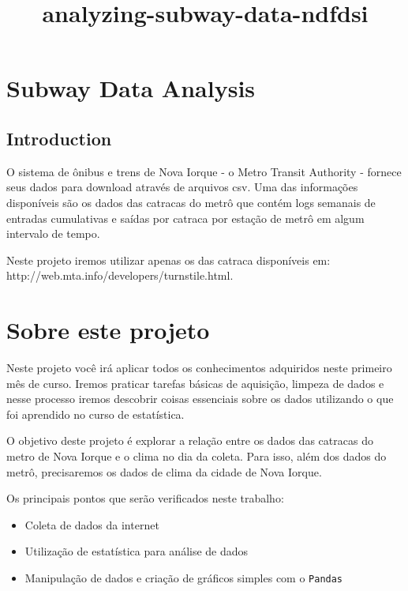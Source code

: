 \documentclass[11pt]{article}
\title{analyzing-subway-data-ndfdsi}
\providecommand{\tightlist}{%
      \setlength{\itemsep}{0pt}\setlength{\parskip}{0pt}}
\begin{document}
    
    
    \maketitle
    
    

    
    \section{Subway Data Analysis}\label{subway-data-analysis}

\subsection{Introduction}\label{introduction}

O sistema de ônibus e trens de Nova Iorque - o Metro Transit Authority -
fornece seus dados para download através de arquivos csv. Uma das
informações disponíveis são os dados das catracas do metrô que contém
logs semanais de entradas cumulativas e saídas por catraca por estação
de metrô em algum intervalo de tempo.

Neste projeto iremos utilizar apenas os das catraca disponíveis em:
http://web.mta.info/developers/turnstile.html.

    \section{Sobre este projeto}\label{sobre-este-projeto}

Neste projeto você irá aplicar todos os conhecimentos adquiridos neste
primeiro mês de curso. Iremos praticar tarefas básicas de aquisição,
limpeza de dados e nesse processo iremos descobrir coisas essenciais
sobre os dados utilizando o que foi aprendido no curso de estatística.

O objetivo deste projeto é explorar a relação entre os dados das
catracas do metro de Nova Iorque e o clima no dia da coleta. Para isso,
além dos dados do metrô, precisaremos os dados de clima da cidade de
Nova Iorque.

Os principais pontos que serão verificados neste trabalho:

\begin{itemize}
\tightlist
\item
  Coleta de dados da internet
\item
  Utilização de estatística para análise de dados
\item
  Manipulação de dados e criação de gráficos simples com o
  \texttt{Pandas}
\end{itemize}
\end{document}
